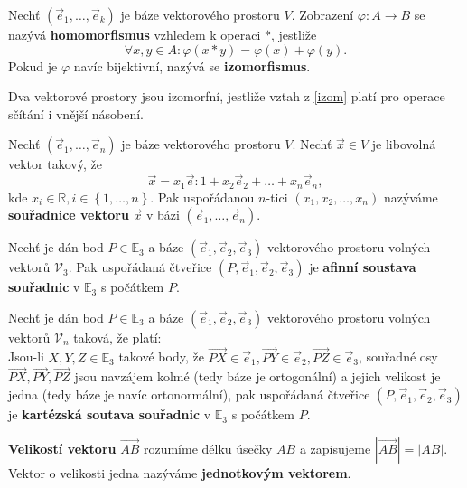 \begin{definition}\label{izom}
    Nechť $(\vec e_1,\dots, \vec e_k)$ je báze vektorového prostoru $V$. Zobrazení
    $\varphi: A\to B$ se nazývá \textbf{homomorfismus} vzhledem k operaci $*$, jestliže
    $$\forall x,y \in A:\varphi(x*y)=\varphi(x)+\varphi(y).$$
    Pokud je $\varphi$ navíc bijektivní, nazývá se \textbf{izomorfismus}.
\end{definition}

\begin{pozn}
    Dva vektorové prostory jsou izomorfní, jestliže vztah z \ref{izom} platí pro
    operace sčítání i vnější násobení.
\end{pozn}

\begin{definition}
    Nechť $(\vec e_1, \dots, \vec e_n)$ je báze vektorového prostoru $V$. Nechť
    $\vec x \in V$ je libovolná vektor takový, že
    $$\vec x = x_1\vec e:1 + x_2\vec e_2 + \dots + x_n\vec e_n,$$
    kde $x_i \in \mathbb R, i\in \left \{ 1,\dots,n \right \} .$ Pak uspořádanou
    $n$-tici $(x_1, x_2,\dots,x_n)$ nazýváme \textbf{souřadnice vektoru} $\vec x$ v
    bázi $(\vec e_1, \dots, \vec e_n)$.
\end{definition}

\begin{definition}
    Nechť je dán bod $P\in \mathbb E_3$ a báze $(\vec e_1, \vec e_2, \vec e_3)$ vektorového
    prostoru volných vektorů $\mathscr V_3$. Pak uspořádaná čtveřice
    $(P, \vec e_1, \vec e_2, \vec e_3)$ je
    \textbf{afinní soustava souřadnic} v $\mathbb E_3$ s počátkem $P$.
\end{definition}

\begin{definition}
    Nechť je dán bod $P\in \mathbb E_3$ a báze $(\vec e_1, \vec e_2, \vec e_3)$ vektorového
    prostoru volných vektorů $\mathscr V_n$ taková, že platí:\\
    Jsou-li $X,Y,Z\in \mathbb E_3$ takové body, že
    $\overrightarrow{PX}\in\vec e_1,\overrightarrow{PY}\in\vec e_2,
    \overrightarrow{PZ}\in\vec e_3$, souřadné osy $\overrightarrow{PX},\overrightarrow{PY},
    \overrightarrow{PZ}$ jsou navzájem kolmé (tedy báze je ortogonální) a jejich velikost je jedna (tedy báze je navíc ortonormální),
    pak uspořádaná čtveřice $(P, \vec e_1, \vec e_2, \vec e_3)$ je \textbf{kartézská
    soutava souřadnic} v $\mathbb E_3$ s počátkem $P$.
\end{definition}

\begin{definition}
\textbf{Velikostí vektoru} $\overrightarrow{AB}$ rozumíme délku úsečky $AB$ a zapisujeme
$|\overrightarrow{AB}| = |AB|.$ Vektor o velikosti jedna nazýváme \textbf{jednotkovým
vektorem}.
\end{definition}

